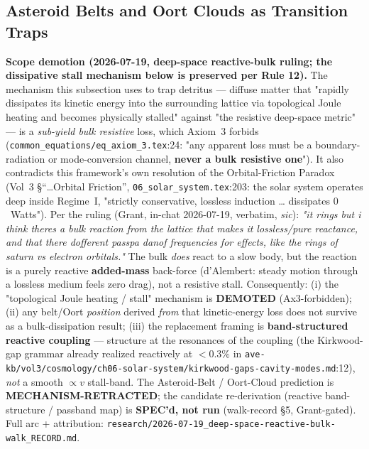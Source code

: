 \subsection{Asteroid Belts and Oort Clouds as Transition Traps}
\noindent\textbf{Scope demotion (2026-07-19, deep-space reactive-bulk ruling; the dissipative stall mechanism below is preserved per Rule 12).} The mechanism this subsection uses to trap detritus --- diffuse matter that "rapidly dissipates its kinetic energy into the surrounding lattice via topological Joule heating and becomes physically stalled" against "the resistive deep-space metric" --- is a \emph{sub-yield bulk resistive} loss, which Axiom~3 forbids (\texttt{common\_equations/eq\_axiom\_3.tex}:24: "any apparent loss must be a boundary-radiation or mode-conversion channel, \textbf{never a bulk resistive one}"). It also contradicts this framework's own resolution of the Orbital-Friction Paradox (Vol~3 \S``\ldots{}Orbital Friction'', \texttt{06\_solar\_system.tex}:203: the solar system operates deep inside Regime~I, "strictly conservative, lossless induction \ldots{} dissipates $0$~Watts"). Per the ruling (Grant, in-chat 2026-07-19, verbatim, \emph{sic}): \emph{"it rings but i think theres a bulk reaction from the lattice that makes it lossless/pure reactance, and that there dofferent passpa danof frequencies for effects, like the rings of saturn vs electron orbitals."} The bulk \emph{does} react to a slow body, but the reaction is a purely reactive \textbf{added-mass} back-force (d'Alembert: steady motion through a lossless medium feels zero drag), not a resistive stall. Consequently: (i) the "topological Joule heating / stall" mechanism is \textbf{DEMOTED} (Ax3-forbidden); (ii) any belt/Oort \emph{position} derived \emph{from} that kinetic-energy loss does not survive as a bulk-dissipation result; (iii) the replacement framing is \textbf{band-structured reactive coupling} --- structure at the resonances of the coupling (the Kirkwood-gap grammar already realized reactively at $<0.3\%$ in \texttt{ave-kb/vol3/cosmology/ch06-solar-system/kirkwood-gaps-cavity-modes.md}:12), \emph{not} a smooth $\propto v$ stall-band. The Asteroid-Belt / Oort-Cloud prediction is \textbf{MECHANISM-RETRACTED}; the candidate re-derivation (reactive band-structure / passband map) is \textbf{SPEC'd, not run} (walk-record \S5, Grant-gated). Full arc + attribution: \texttt{research/2026-07-19\_deep-space-reactive-bulk-walk\_RECORD.md}.

